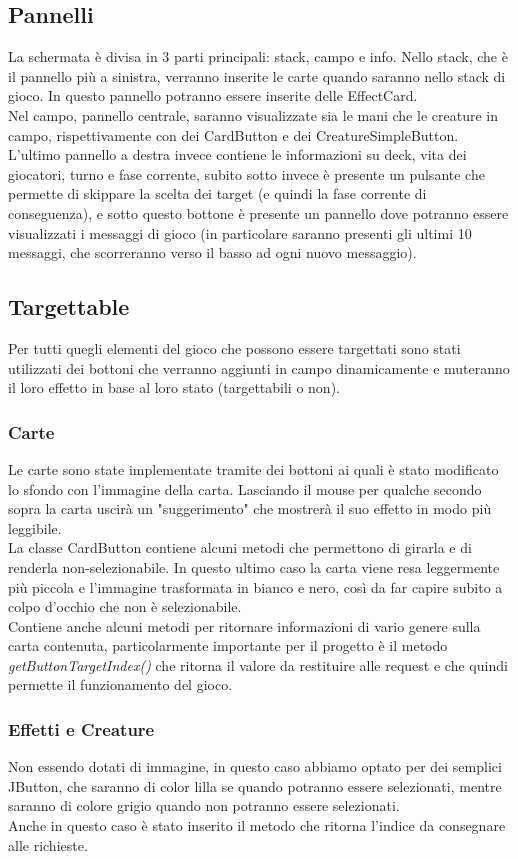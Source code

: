 \documentclass[a4paper]{article}
\begin{document}
	\subsection{Pannelli}
	La schermata è divisa in 3 parti principali: stack, campo e info.
	Nello stack, che è il pannello più a sinistra, verranno inserite le carte quando saranno nello stack di gioco. In questo pannello potranno essere inserite delle EffectCard.\\
	Nel campo, pannello centrale, saranno visualizzate sia le mani che le creature in campo, rispettivamente con dei CardButton e dei CreatureSimpleButton.
	L'ultimo pannello a destra invece contiene le informazioni su deck, vita dei giocatori, turno e fase corrente, subito sotto invece è presente un pulsante che permette di skippare la scelta dei target (e quindi la fase corrente di conseguenza), e sotto questo bottone è presente un pannello dove potranno essere visualizzati i messaggi di gioco (in particolare saranno presenti gli ultimi 10 messaggi, che scorreranno verso il basso ad ogni nuovo messaggio).
	\subsection{Targettable}
	Per tutti quegli elementi del gioco che possono essere targettati sono stati utilizzati dei bottoni che verranno aggiunti in campo dinamicamente e muteranno il loro effetto in base al loro stato (targettabili o non).
	\subsubsection{Carte}
	Le carte sono state implementate tramite dei bottoni ai quali è stato modificato lo sfondo con l'immagine della carta. Lasciando il mouse per qualche secondo sopra la carta uscirà un "suggerimento" che mostrerà il suo effetto in modo più leggibile.\\
	La classe CardButton contiene alcuni metodi che permettono di girarla e di renderla non-selezionabile. In questo ultimo caso la carta viene resa leggermente più piccola e l'immagine trasformata in bianco e nero, così da far capire subito a colpo d'occhio che non è selezionabile.\\
	Contiene anche alcuni metodi per ritornare informazioni di vario genere sulla carta contenuta, particolarmente importante per il progetto è il metodo \textit{getButtonTargetIndex()} che ritorna il valore da restituire alle request e che quindi permette il funzionamento del gioco.
	\subsubsection{Effetti e Creature}
	Non essendo dotati di immagine, in questo caso abbiamo optato per dei semplici JButton, che saranno di color lilla se quando potranno essere selezionati, mentre saranno di colore grigio quando non potranno essere selezionati.
	\\Anche in questo caso è stato inserito il metodo che ritorna l'indice da consegnare alle richieste.
\end{document}
